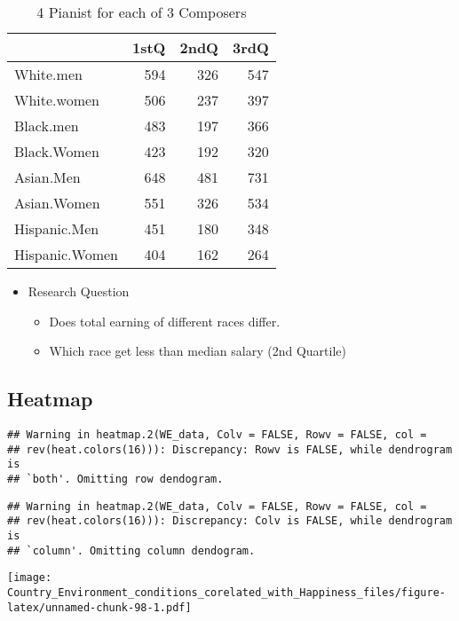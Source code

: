 \documentclass[]{book}
\providecommand{\tightlist}{%
  \setlength{\itemsep}{0pt}\setlength{\parskip}{0pt}}
\begin{document}
\begin{table}

\caption{\label{tab:nice-tab-ca}4 Pianist for each of 3 Composers}
\centering
\begin{tabular}[t]{lrrr}
\toprule
  & 1stQ & 2ndQ & 3rdQ\\
\midrule
White.men & 594 & 326 & 547\\
White.women & 506 & 237 & 397\\
Black.men & 483 & 197 & 366\\
Black.Women & 423 & 192 & 320\\
Asian.Men & 648 & 481 & 731\\
\addlinespace
Asian.Women & 551 & 326 & 534\\
Hispanic.Men & 451 & 180 & 348\\
Hispanic.Women & 404 & 162 & 264\\
\bottomrule
\end{tabular}
\end{table}

\begin{itemize}
\item
  Research Question

  \begin{itemize}
  \tightlist
  \item
    Does total earning of different races differ.
  \item
    Which race get less than median salary (2nd Quartile)
  \end{itemize}
\end{itemize}

\hypertarget{heatmap-3}{%
\subsection{Heatmap}\label{heatmap-3}}

\begin{verbatim}
## Warning in heatmap.2(WE_data, Colv = FALSE, Rowv = FALSE, col =
## rev(heat.colors(16))): Discrepancy: Rowv is FALSE, while dendrogram is
## `both'. Omitting row dendogram.
\end{verbatim}

\begin{verbatim}
## Warning in heatmap.2(WE_data, Colv = FALSE, Rowv = FALSE, col =
## rev(heat.colors(16))): Discrepancy: Colv is FALSE, while dendrogram is
## `column'. Omitting column dendogram.
\end{verbatim}

\texttt{[image: Country\_Environment\_conditions\_corelated\_with\_Happiness\_files/figure-latex/unnamed-chunk-98-1.pdf]}
\end{document}
